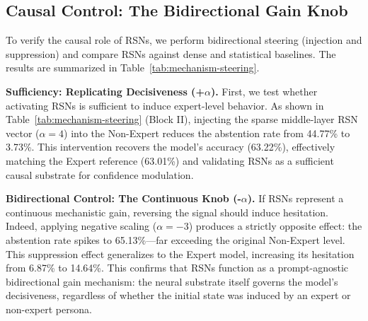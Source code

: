 \documentclass{article}
\begin{document}
\subsection{Causal Control: The Bidirectional Gain Knob}
\label{sec:causal-control}
To verify the causal role of RSNs, we perform bidirectional steering (injection and suppression) and compare RSNs against dense and statistical baselines. The results are summarized in Table~\ref{tab:mechanism-steering}.

\textbf{Sufficiency: Replicating Decisiveness (+$\alpha$).} 
First, we test whether activating RSNs is sufficient to induce expert-level behavior. As shown in Table~\ref{tab:mechanism-steering} (Block II), injecting the sparse middle-layer RSN vector ($\alpha=4$) into the Non-Expert reduces the abstention rate from 44.77\% to 3.73\%. This intervention recovers the model's accuracy (63.22\%), effectively matching the Expert reference (63.01\%) and validating RSNs as a sufficient causal substrate for confidence modulation.

\textbf{Bidirectional Control: The Continuous Knob (-$\alpha$).} 
If RSNs represent a continuous mechanistic gain, reversing the signal should induce hesitation. Indeed, applying negative scaling ($\alpha{=}-3$) produces a strictly opposite effect: the abstention rate spikes to 65.13\%—far exceeding the original Non-Expert level. This suppression effect generalizes to the Expert model, increasing its hesitation from 6.87\% to 14.64\%. This confirms that RSNs function as a prompt-agnostic bidirectional gain mechanism: the neural substrate itself governs the model's decisiveness, regardless of whether the initial state was induced by an expert or non-expert persona.
\end{document}
